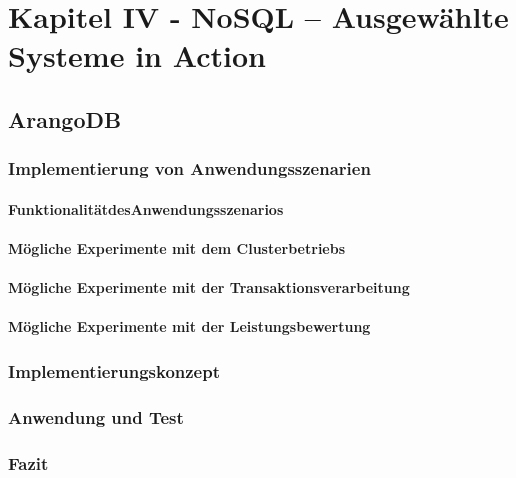 \chapter{Kapitel IV - NoSQL – Ausgewählte Systeme in Action}
\setcounter{section}{7}
\section{ArangoDB}

\subsection{Implementierung von Anwendungsszenarien}
\subsubsection{FunktionalitätdesAnwendungsszenarios}
\subsubsection{Mögliche Experimente mit dem Clusterbetriebs}
\subsubsection{Mögliche Experimente mit der Transaktionsverarbeitung}
\subsubsection{Mögliche Experimente mit der Leistungsbewertung}

\subsection{Implementierungskonzept}

\subsection{Anwendung und Test}

\subsection{Fazit}